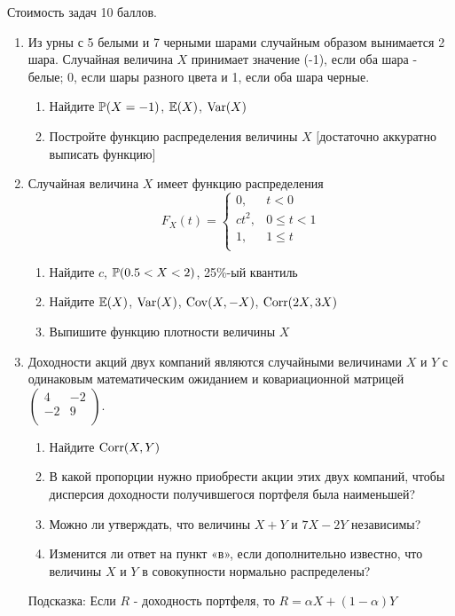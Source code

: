 Стоимость задач 10 баллов.

\begin{enumerate}
\item Из урны с 5 белыми и 7 черными шарами случайным образом вынимается
2 шара. Случайная величина $X$ принимает значение (-1), если оба
шара - белые; 0, если шары разного цвета и 1, если оба шара
черные.
\begin{enumerate}
\item Найдите $\P(X=-1)$, $\E(X)$, $\Var(X)$
\item Постройте функцию распределения величины $X$ $[$достаточно аккуратно выписать функцию$]$
\end{enumerate}

\item Случайная величина $X$ имеет функцию распределения
\[
F_{X}(t)=
\begin{cases}
  0, & t<0 \\
  ct^{2}, & 0\le t <1 \\
  1, & 1\le t \\
\end{cases}
\]
\begin{enumerate}
\item Найдите $c$, $\P(0.5<X<2)$, 25\%-ый квантиль
\item Найдите $\E(X)$, $\Var(X)$, $\Cov(X,-X)$, $\Corr(2X,3X)$
\item Выпишите функцию плотности величины $X$
\end{enumerate}

\item Доходности акций двух компаний являются случайными величинами $X$
и $Y$ с одинаковым математическим ожиданием и ковариационной
матрицей  $\left(%
\begin{array}{cc}
  4 & -2 \\
  -2 & 9 \\
\end{array}%
\right).$
\begin{enumerate}
\item Найдите $\Corr(X,Y)$
\item В какой пропорции нужно приобрести акции этих двух
компаний, чтобы дисперсия доходности получившегося портфеля была наименьшей?
\item Можно ли утверждать, что величины $X+Y$ и $7X-2Y$ независимы?
\item Изменится ли ответ на пункт «в», если дополнительно
известно, что величины $X$ и $Y$ в совокупности нормально распределены?
\end{enumerate}
Подсказка: Если $R$ - доходность портфеля, то $R=\alpha
X+(1-\alpha)Y$


\end{enumerate}
